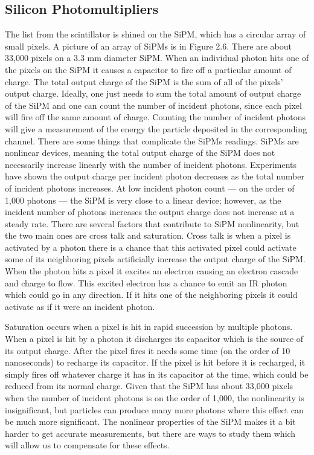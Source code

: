 \subsection{Silicon Photomultipliers}
The list from the scintillator is shined on the SiPM, which has a circular array of small pixels. A picture of an array of SiPMs is in Figure 2.6. There are about 33,000 pixels on a 3.3 mm diameter SiPM. When an individual photon hits one of the pixels on the SiPM it causes a capacitor to fire off a particular amount of charge. The total output charge of the SiPM is the sum of all of the pixels' output charge. Ideally, one just needs to sum the total amount of output charge of the SiPM and one can count the number of incident photons, since each pixel will fire off the same amount of charge. Counting the number of incident photons will give a measurement of the energy the particle deposited in the corresponding channel. There are some things that complicate the SiPMs readings. SiPMs are nonlinear devices, meaning the total output charge of the SiPM does not necessarily increase linearly with the number of incident photons. Experiments have shown the output charge per incident photon decreases as the total number of incident photons increases. At low incident photon count --- on the order of 1,000 photons --- the SiPM is very close to a linear device; however, as the incident number of photons increases the output charge does not increase at a steady rate. There are several factors that contribute to SiPM nonlinearity, but the two main ones are cross talk and saturation. Cross talk is when a pixel is activated by a photon there is a chance that this activated pixel could activate some of its neighboring pixels artificially increase the output charge of the SiPM. When the photon hits a pixel it excites an electron causing an electron cascade and charge to flow. This excited electron has a chance to emit an IR photon which could go in any direction. If it hits one of the neighboring pixels it could activate as if it were an incident photon. 

Saturation occurs when a pixel is hit in rapid succession by multiple photons. When a pixel is hit by a photon it discharges its capacitor which is the source of its output charge. After the pixel fires it needs some time (on the order of 10 nanoseconds) to recharge its capacitor. If the pixel is hit before it is recharged, it simply fires off whatever charge it has in its capacitor at the time, which could be reduced from its normal charge. Given that the SiPM has about 33,000 pixels when the number of incident photons is on the order of 1,000, the nonlinearity is insignificant, but particles can produce many more photons where this effect can be much more significant. The nonlinear properties of the SiPM makes it a bit harder to get accurate measurements, but there are ways to study them which will allow us to compensate for these effects.

